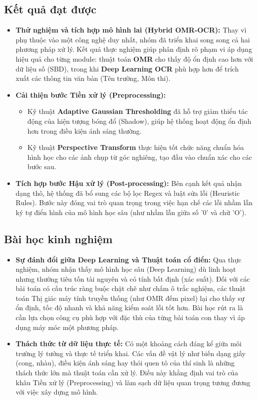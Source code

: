 \documentclass[6pt, a4paper]{report}
\begin{document}
	\subsection{Kết quả đạt được}
	\begin{itemize}
		\item \textbf{Thử nghiệm và tích hợp mô hình lai (Hybrid OMR-OCR):} 
		Thay vì phụ thuộc vào một công nghệ duy nhất, nhóm đã triển khai song song cả hai phương pháp xử lý. Kết quả thực nghiệm giúp phân định rõ phạm vi áp dụng hiệu quả cho từng module: thuật toán \textbf{OMR} cho thấy độ ổn định cao hơn với dữ liệu số (SBD), trong khi \textbf{Deep Learning OCR} phù hợp hơn để trích xuất các thông tin văn bản (Tên trường, Môn thi).
		
		\item \textbf{Cải thiện bước Tiền xử lý (Preprocessing):}
		\begin{itemize}
			\item Kỹ thuật \textbf{Adaptive Gaussian Thresholding} đã hỗ trợ giảm thiểu tác động của hiện tượng bóng đổ (Shadow), giúp hệ thống hoạt động ổn định hơn trong điều kiện ánh sáng thường.
			\item Kỹ thuật \textbf{Perspective Transform} thực hiện tốt chức năng chuẩn hóa hình học cho các ảnh chụp từ góc nghiêng, tạo đầu vào chuẩn xác cho các bước sau.
		\end{itemize}
		
		\item \textbf{Tích hợp bước Hậu xử lý (Post-processing):} 
		Bên cạnh kết quả nhận dạng thô, hệ thống đã bổ sung các bộ lọc Regex và luật sửa lỗi (Heuristic Rules). Bước này đóng vai trò quan trọng trong việc hạn chế các lỗi nhầm lẫn ký tự điển hình của mô hình học sâu (như nhầm lẫn giữa số '0' và chữ 'O').
	\end{itemize}
	
	\subsection{Bài học kinh nghiệm}
	\begin{itemize}
		\item \textbf{Sự đánh đổi giữa Deep Learning và Thuật toán cổ điển:} 
		Qua thực nghiệm, nhóm nhận thấy mô hình học sâu (Deep Learning) dù linh hoạt nhưng thường tiêu tốn tài nguyên và có tính bất định (xác suất). Đối với các bài toán có cấu trúc ràng buộc chặt chẽ như chấm ô trắc nghiệm, các thuật toán Thị giác máy tính truyền thống (như OMR đếm pixel) lại cho thấy sự ổn định, tốc độ nhanh và khả năng kiểm soát lỗi tốt hơn. Bài học rút ra là cần lựa chọn công cụ phù hợp với đặc thù của từng bài toán con thay vì áp dụng máy móc một phương pháp.
		
		\item \textbf{Thách thức từ dữ liệu thực tế:} 
		Có một khoảng cách đáng kể giữa môi trường lý tưởng và thực tế triển khai. Các vấn đề vật lý như biến dạng giấy (cong, nhàu), điều kiện ánh sáng hay thói quen tô của thí sinh là những thách thức lớn mà thuật toán cần xử lý. Điều này khẳng định vai trò của khâu Tiền xử lý (Preprocessing) và làm sạch dữ liệu quan trọng tương đương với việc xây dựng mô hình.
	\end{itemize}
	
\end{document}
